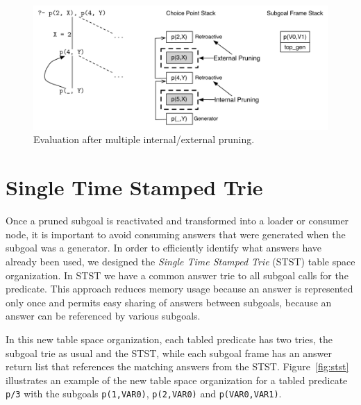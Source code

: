 \begin{figure}[ht]
  \centering
    \includegraphics[scale=0.6]{retro_mix_multiple_after.pdf}
  \caption{Evaluation after multiple internal/external pruning.}
  \label{fig:retro_mix_multiple_after}
\end{figure}

\section{Single Time Stamped Trie}

Once a pruned subgoal is reactivated and transformed into a loader or consumer node,
it is important to avoid consuming answers that were generated when the subgoal was a
generator.
In order to efficiently identify what answers have already been used, we designed
the \textit{Single Time Stamped Trie} (STST) table space organization.
In STST we have a common answer trie to all subgoal calls for the predicate. This approach
reduces memory usage because an answer is represented only once and permits easy sharing of
answers between subgoals, because an answer can be referenced by various subgoals.

In this new table space organization, each tabled predicate has two tries, the subgoal trie as usual and
the STST, while each subgoal frame has an answer return list that references the matching answers
from the STST. Figure~\ref{fig:stst} illustrates an example of the new table space organization
for a tabled predicate \texttt{p/3} with the subgoals \texttt{p(1,VAR0)}, \texttt{p(2,VAR0)} and \texttt{p(VAR0,VAR1)}.

